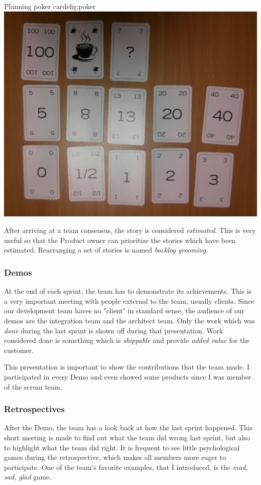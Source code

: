 \begin{figureGraphics}{Planning poker cards}{fig:poker}
    \includegraphics[width=\textwidth]{./src/img/poker.jpg}
\end{figureGraphics}

After arriving at a team consensus, the story is considered \emph{estimated}. This
is very useful so that the Product owner can prioritize the stories which have
been estimated. Rearranging a set of stories is named \emph{backlog grooming}.


\subsubsection{Demos}
At the end of each sprint, the team has to demonstrate its achievements. This
is a very important meeting with people external to the team, usually clients.
Since our development team haves no "client" in standard sense, the audience of our demos are
the integration team and the architect team.
Only the work which was \emph{done} during the last sprint is shown off during that presentation.
Work considered done is something which is \emph{shippable} and provide \emph{added value} for the customer.

This presentation is important to show the contributions that the team made.
I participated in every Demo and even showed some products since I was member of the \gls{scrum} team.

\subsubsection{Retrospectives}
After the Demo, the team has a look back at how the last sprint happened. This short meeting is made
to find out what the team did wrong last sprint, but also to highlight what the team did right.
It is frequent to see little psychological games during the retrospective, which makes all members more
eager to participate. One of the team's favorite examples, that I introduced, is the \emph{mad, sad, glad} game.

